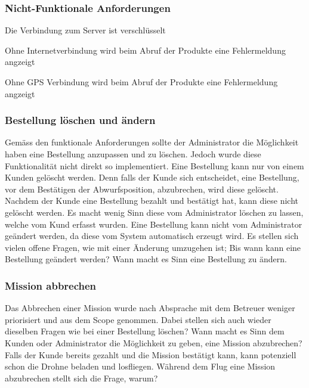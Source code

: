 \subsubsection{Nicht-Funktionale Anforderungen}
\begin{todolist}
	\item[\done] Die Verbindung zum Server ist verschlüsselt
	\item[\done] Ohne Internetverbindung wird beim Abruf der Produkte eine Fehlermeldung angzeigt
	\item[\done] Ohne GPS Verbindung wird beim Abruf der Produkte eine Fehlermeldung angzeigt
\end{todolist}



\subsubsection{Bestellung löschen und ändern}
Gemäss den funktionale Anforderungen sollte der Administrator die Möglichkeit haben eine Bestellung anzupassen und zu löschen. 
Jedoch wurde diese Funktionalität nicht direkt so implementiert. 
Eine Bestellung kann nur von einem Kunden gelöscht werden. 
Denn falls der Kunde sich entscheidet, eine Bestellung, vor dem Bestätigen der Abwurfsposition, abzubrechen, wird diese gelöscht. 
Nachdem der Kunde eine Bestellung bezahlt und bestätigt hat, kann diese nicht gelöscht werden. 
Es macht wenig Sinn diese vom Administrator löschen zu lassen, welche vom Kund erfasst wurden. 
Eine Bestellung kann nicht vom Administrator geändert werden, da diese vom System automatisch erzeugt wird. 
Es stellen sich vielen offene Fragen, wie mit einer Änderung umzugehen ist; Bis wann kann eine Bestellung geändert werden?
Wann macht es Sinn eine Bestellung zu ändern. 

\subsubsection{Mission abbrechen}
Das Abbrechen einer Mission wurde nach Absprache mit dem Betreuer weniger priorisiert und aus dem Scope genommen. 
Dabei stellen sich auch wieder dieselben Fragen wie bei einer Bestellung löschen? 
Wann macht es Sinn dem Kunden oder Administrator die Möglichkeit zu geben, eine Mission abzubrechen?
Falls der Kunde bereits gezahlt und die Mission bestätigt kann, kann potenziell schon die Drohne beladen und losfliegen. 
Während dem Flug eine Mission abzubrechen stellt sich die Frage, warum? 


